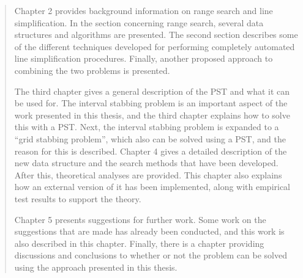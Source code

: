 \begin{quotation}
Chapter 2 provides background information on range search and line simplification. In the section concerning range search, several data structures and algorithms are presented. The second section describes some of the different techniques developed for performing completely automated line simplification procedures. Finally, another proposed approach to combining the two problems is presented.

The third chapter gives a general description of the PST and what it can be used for. The interval
stabbing problem is an important aspect of the work presented in this thesis, and the third chapter
explains how to solve this with a PST. Next, the interval stabbing problem is expanded to a ``grid
stabbing problem”, which also can be solved using a PST, and the reason for this is described. Chapter 4 gives a detailed description of the new data structure and the search methods that
have been developed. After this, theoretical analyses are provided. This chapter also explains how
an external version of it has been implemented, along with empirical test results to support the theory.

Chapter 5 presents suggestions for further work. Some work on the suggestions that are made has already been conducted, and this work is also described in this chapter. Finally, there is a chapter providing discussions and conclusions to whether or not the problem can be solved using the approach presented in this thesis.
\end{quotation}

